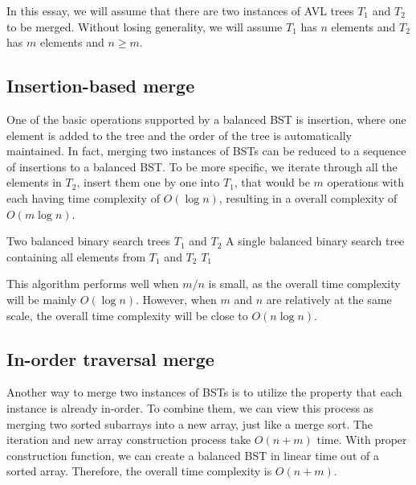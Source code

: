\documentclass[12pt]{article}
\begin{document}
In this essay, we will assume that there are two instances of AVL trees $T_1$ and $T_2$ to be merged. Without losing generality, we will assume $T_1$ has $n$ elements and $T_2$ has $m$ elements and $n \ge m$.



\subsection{Insertion-based merge}

One of the basic operations supported by a balanced BST is insertion, where one element is added to the tree and the order of the tree is automatically maintained. In fact, merging two instances of BSTs can be reduced to a sequence of insertions to a balanced BST. To be more specific, we iterate through all the elements in $T_2$, insert them one by one into $T_1$, that would be $m$ operations with each having time complexity of $O(\log n)$, resulting in a overall complexity of $O(m\log n)$. 

\begin{tcolorbox}[colback=orange!5!white, colframe=orange!75!black, title=Algorithm: Insertion-Based Merge]
\begin{algorithmic}[1]
\Require Two balanced binary search trees $T_1$ and $T_2$
\Ensure A single balanced binary search tree containing all elements from $T_1$ and $T_2$
        \State {}
    \EndFor
    \State \Return $T_1$
\EndProcedure
\end{algorithmic}
\end{tcolorbox}

This algorithm performs well when $m/n$ is small, as the overall time complexity will be mainly $O(\log n)$. However, when $m$ and $n$ are relatively at the same scale, the overall time complexity will be close to $O(n\log n)$.

\subsection{In-order traversal merge}

Another way to merge two instances of BSTs is to utilize the property that each instance is already in-order. To combine them, we can view this process as merging two sorted subarrays into a new array, just like a merge sort. The iteration and new array construction process take $O(n+m)$ time. With proper construction function, we can create a balanced BST in linear time out of a sorted array. Therefore, the overall time complexity is $O(n+m)$.
\end{document}
